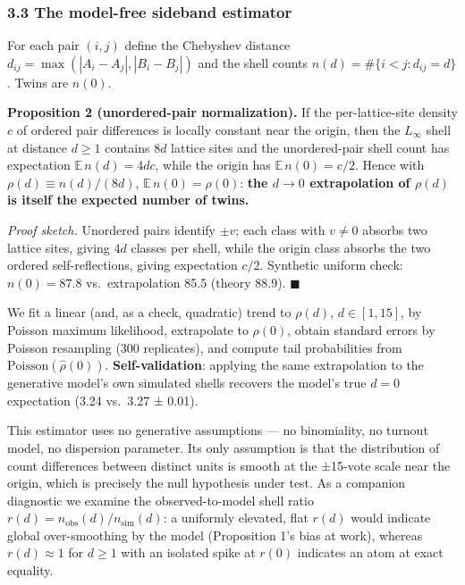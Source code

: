 \documentclass[
  11pt,
]{article}
\begin{document}
\subsubsection{3.3 The model-free sideband
estimator}\label{the-model-free-sideband-estimator}

For each pair \((i, j)\) define the Chebyshev distance
\(d_{ij} = \max(|A_i - A_j|,
|B_i - B_j|)\) and the shell counts \(n(d) = \#\{i < j : d_{ij} = d\}\).
Twins are \(n(0)\).

\textbf{Proposition 2 (unordered-pair normalization).} If the
per-lattice-site density \(c\) of ordered pair differences is locally
constant near the origin, then the \(L_\infty\) shell at distance
\(d \ge 1\) contains \(8d\) lattice sites and the unordered-pair shell
count has expectation \(\mathbb E\, n(d) = 4dc\), while the origin has
\(\mathbb E\, n(0) = c/2\). Hence with \(\rho(d) \equiv n(d)/(8d)\),
\(\mathbb E\, n(0) = \rho(0)\): \textbf{the \(d \to 0\) extrapolation of
\(\rho(d)\) is itself the expected number of twins.}

\emph{Proof sketch.} Unordered pairs identify \(\pm v\); each class with
\(v \ne 0\) absorbs two lattice sites, giving \(4d\) classes per shell,
while the origin class absorbs the two ordered self-reflections, giving
expectation \(c/2\). Synthetic uniform check: \(n(0) = 87.8\)
vs.~extrapolation 85.5 (theory 88.9). \(\blacksquare\)

We fit a linear (and, as a check, quadratic) trend to \(\rho(d)\),
\(d \in [1, 15]\), by Poisson maximum likelihood, extrapolate to
\(\rho(0)\), obtain standard errors by Poisson resampling (300
replicates), and compute tail probabilities from
\(\mathrm{Poisson}(\hat\rho(0))\). \textbf{Self-validation}: applying
the same extrapolation to the generative model's own simulated shells
recovers the model's true \(d = 0\) expectation (3.24 vs.~3.27 ± 0.01).

This estimator uses no generative assumptions --- no binomiality, no
turnout model, no dispersion parameter. Its only assumption is that the
distribution of count differences between distinct units is smooth at
the ±15-vote scale near the origin, which is precisely the null
hypothesis under test. As a companion diagnostic we examine the
observed-to-model shell ratio
\(r(d) = n_{\mathrm{obs}}(d) / n_{\mathrm{sim}}(d)\): a uniformly
elevated, flat \(r(d)\) would indicate global over-smoothing by the
model (Proposition 1's bias at work), whereas \(r(d) \approx 1\) for
\(d \ge 1\) with an isolated spike at \(r(0)\) indicates an atom at
exact equality.
\end{document}
